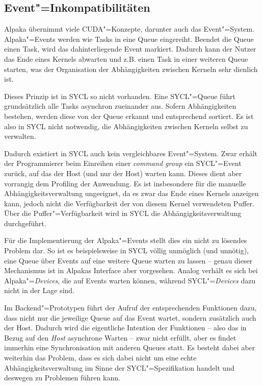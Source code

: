 \subsection{Event"=Inkompatibilitäten}

Alpaka übernimmt viele CUDA"=Konzepte, darunter auch das Event"=System.
Alpaka"=Events werden wie Tasks in eine Queue eingereiht. Beendet die Queue
einen Task, wird das dahinterliegende Event markiert. Dadurch kann der Nutzer
das Ende eines Kernels abwarten und z.B. einen Task in einer weiteren Queue
starten, was der Organisation der Abhängigkeiten zwischen Kerneln sehr dienlich
ist.

Dieses Prinzip ist in SYCL so nicht vorhanden. Eine SYCL"=Queue führt
grundsätzlich alle Tasks asynchron zueinander aus. Sofern Abhängigkeiten
bestehen, werden diese von der Queue erkannt und entsprechend sortiert. Es ist
also in SYCL nicht notwendig, die Abhängigkeiten zwischen Kerneln selbst zu
verwalten.

Dadurch existiert in SYCL auch kein vergleichbares Event"=System. Zwar erhält
der Programmierer beim Einreihen einer \textit{command group} ein SYCL"=Event
zurück, auf das der Host (und nur der Host) warten kann. Dieses dient aber
vorrangig dem Profiling der Anwendung. Es ist insbesondere für die manuelle
Abhängigkeitsverwaltung ungeeignet, da es zwar das Ende eines Kernels anzeigen
kann, jedoch nicht die Verfügbarkeit der von diesem Kernel verwendeten Puffer.
Über die Puffer"=Verfügbarkeit wird in SYCL die Abhängigkeitsverwaltung
durchgeführt.

Für die Implementierung der Alpaka"=Events stellt dies ein nicht zu lösendes
Problem dar. So ist es beispielsweise in SYCL völlig unmöglich (und unnötig),
eine Queue über Events auf eine weitere Queue warten zu lassen -- genau dieser
Mechanismus ist in Alpakas Interface aber vorgesehen. Analog verhält es sich bei
Alpaka"=\textit{Devices}, die auf Events warten können, während
SYCL"=\textit{Devices} dazu nicht in der Lage sind.

Im Backend"=Prototypen führt der Aufruf der entsprechenden Funktionen dazu, dass
nicht nur die jeweilige Queue auf das Event wartet, sondern zusätzlich auch der
Host. Dadurch wird die eigentliche Intention der Funktionen -- also das in Bezug
auf den \textit{Host} asynchrone Warten -- zwar nicht erfüllt, aber es findet
immerhin eine Synchronisation mit anderen Queues statt. Es besteht dabei aber
weiterhin das Problem, dass es sich dabei nicht um eine echte
Abhängigkeitsverwaltung im Sinne der SYCL"=Spezifikation handelt und deswegen zu
Problemen führen kann.

